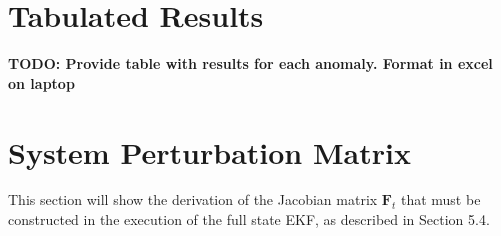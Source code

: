 \chapter{Tabulated Results}
\makeatletter{}\makeatother
\label{appen:Tabulated_Results}
\textbf{TODO: Provide table with results for each anomaly. Format in excel on laptop}

\chapter{System Perturbation Matrix}
\makeatletter{}\makeatother
\label{appen:derivations_bigramseg}
\cite{JansevanVuuren2015}
This section will show the derivation of the Jacobian matrix $\mathbf{F}_{t}$ that must be constructed in the execution of the full state EKF, as described in Section 5.4.

